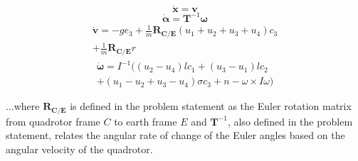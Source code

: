 \documentclass{article}
\begin{document}
\begin{multicols}{2}
\begin{equation}
    \mathbf{\dot{x}} =\mathbf{v}
\end{equation}
\begin{equation}
    \bm{\dot{\alpha}} =\mathbf{T}^{-1}\bm{\omega}
\end{equation}
\begin{align}
    \mathbf{\dot{v}} =-ge_3+\frac{1}{m}\mathbf{R_{C/E}}(u_1+u_2+u_3+u_4)c_3 \nonumber\\ +\frac{1}{m}\mathbf{R_{C/E}}r
\end{align}
\begin{align}
    \bm{\dot{\omega}} =I^{-1}((u_2-u_4)lc_1+(u_3-u_1)lc_2 \nonumber\\ +(u_1-u_2+u_3-u_4)\sigma c_3+n-\omega \times I \omega)
\end{align}

\noindent ...where $\mathbf{R_{C/E}}$ is defined in the problem statement as the Euler rotation matrix from quadrotor frame $C$ to earth frame $E$ and $\mathbf{T}^{-1}$, also defined in the problem statement, relates the angular rate of change of the Euler angles based on the angular velocity of the quadrotor.


\end{multicols}
\end{document}

